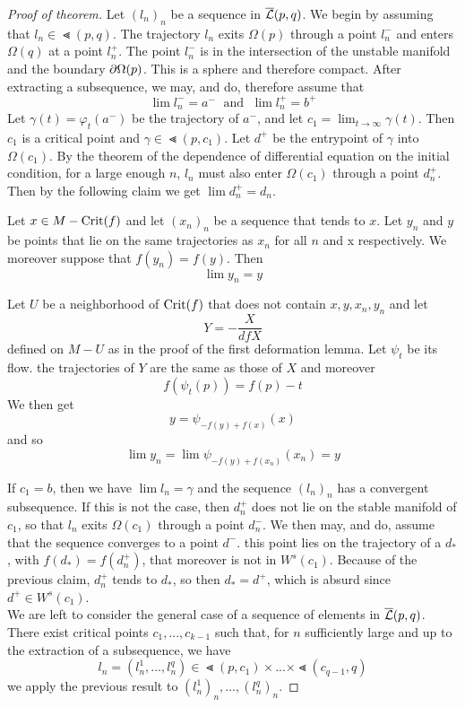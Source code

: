 \begin{proof}[Proof of theorem]
    Let $(l_n)_n$ be a sequence in ${\overline{\mathcal{L}} }(p, q)$.
    We begin by assuming that $l_n \in \Lt(p, q)$. The trajectory $l_n$ exits 
    $\Omega(p)$ through a point $l_n^-$ and enters $\Omega(q)$ at a point $l_n^+$.
    The point $l_n^-$ is in the intersection of the unstable manifold and the boundary
    ${ \partial } \Omega (p)$. This is a sphere and therefore compact. After extracting a 
    subsequence, we may, and do, therefore assume that
    \[ \lim l_n^- = a^- \; \text{ and } \; \lim l_n^+ = b^+ \]
    Let $\gamma(t) = \varphi_t(a^-)$ be the trajectory of $a^-$, and let 
    $c_1 = \lim_{t \to \infty} \gamma(t)$. Then $c_1$ is a critical point and 
    $\gamma \in \Lt (p, c_1)$. Let $d^+$ be the entrypoint of $\gamma$ into
    $\Omega (c_1)$. By the theorem of the dependence of differential equation on the 
    initial condition, for a large enough $n$, $l_n$ must also enter $\Omega(c_1)$
    through a point $d_n^+$. Then by the following claim we get $\lim d_n^+ = d_n$.
    \begin{claim*}
        Let $x \in M - { \operatorname{Crit} } (f)$ and let $(x_n)_n$ be a sequence that tends to $x$.
        Let $y_n$ and $y$ be points that lie on the same trajectories as $x_n$ for all
        $n$ and x respectively. We moreover suppose that $f(y_n) = f(y)$. Then 
        \[ \lim y_n = y \]
    \end{claim*}
    \begin{smallproof}
        Let $U$ be a neighborhood of ${ \operatorname{Crit} } (f)$ that does not contain 
        $x, y, x_n, y_n$ and let 
        \[ Y = - \frac{X}{dfX} \]
        defined on $M - U$ as in the proof of the first deformation lemma. Let 
        $\psi_t$ be its flow. the trajectories of $Y$ are the same as those of $X$
        and moreover 
        \[ f(\psi_t(p)) = f(p) - t \]
        We then get
        \[ y = \psi_{- f(y) + f(x)}(x)\]
        and so
        \[ \lim y_n = \lim \psi_{-f(y) + f(x_n)} (x_n) = y \]
    \end{smallproof}
    If $c_1 = b$, then we have $\lim l_n = \gamma$ and the sequence $(l_n)_n$ has a 
    convergent subsequence. If this is not the case, then $d_n^+$ does not lie on
    the stable manifold of $c_1$, so that $l_n$ exits $\Omega (c_1)$ through a point
    $d_n^-$. We then may, and do, assume that the sequence converges to a point 
    $d^-$. this point lies on the trajectory of a $d_{\ast}$, with 
    $f(d_{\ast}) = f(d_n^+)$, that moreover is not in $W^s (c_1)$. Because of the 
    previous claim, $d_n^+$ tends to $d_{\ast}$, so then $d_{\ast} = d^+$, which is
    absurd since $d^+ \in W^s(c_1)$. \\
    We are left to consider the general case of a sequence of elements in ${\overline{\mathcal{L}} } (p, q)$.
    There exist critical points $c_1, ..., c_{k - 1}$ such that, for $n$ sufficiently
    large and up to the extraction of a subsequence, we have
    \[ l_n = (l^1_n, ..., l^q_n) \in \Lt(p, c_1) \times ... \times \Lt(c_{q - 1}, q) \]
    we apply the previous result to $(l^1_n)_n, ..., (l^q_n)_n$.
\end{proof}

